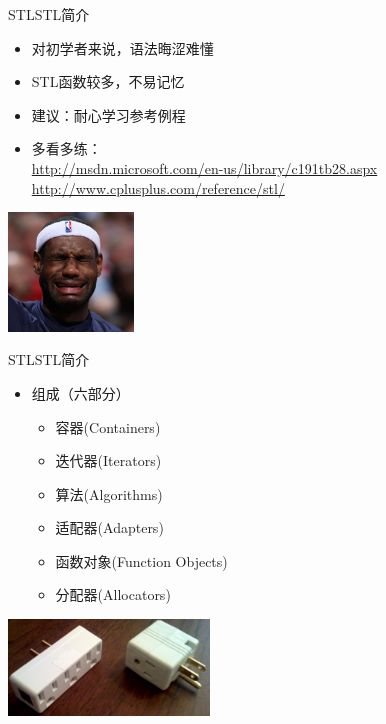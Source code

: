 \begin{frame}[t, fragile]{STL}{STL简介}%
  \begin{spacing}{1.4}
  \begin{itemize}
  \item 对初学者来说，语法晦涩难懂
  \item STL函数较多，不易记忆
  \item 建议：耐心学习参考例程
  \item 多看多练：\\
    \vspace{1em}
    \tiny
    \url{http://msdn.microsoft.com/en-us/library/c191tb28.aspx}\\
    \vspace{1em}
    \tiny \url{http://www.cplusplus.com/reference/stl/}
  \end{itemize}
  \begin{center}
    \includegraphics[width=0.25\textwidth]{figure/chap07/02stl02}
  \end{center}
  \end{spacing}
\end{frame}

\begin{frame}[t, fragile]{STL}{STL简介}%
  \begin{spacing}{1.6}
  \begin{itemize}
  \item 组成（六部分）
    \begin{itemize}
    \item \alert{容器(Containers) }
    \item \alert{迭代器(Iterators) }
    \item \alert{算法(Algorithms)}
    \item 适配器(Adapters)
    \item 函数对象(Function Objects)
    \item 分配器(Allocators)
    \end{itemize}
  \end{itemize}
  \begin{center}
    \includegraphics[width=0.4\textwidth]{figure/chap07/02stl03}
  \end{center}
  \end{spacing}
\end{frame}

